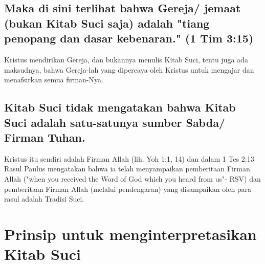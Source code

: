 \subsection{Maka di sini terlihat bahwa Gereja/ jemaat (bukan Kitab Suci saja) adalah "tiang penopang dan dasar kebenaran." (1 Tim 3:15)}
Kristus mendirikan Gereja, dan bukannya menulis Kitab Suci, tentu juga ada maksudnya, bahwa Gereja-lah yang dipercaya oleh Kristus untuk mengajar dan menafsirkan semua firman-Nya.

\subsection{Kitab Suci tidak mengatakan bahwa Kitab Suci adalah satu-satunya sumber Sabda/ Firman Tuhan.}
Kristus itu sendiri adalah Firman Allah (lih. Yoh 1:1, 14) dan dalam 1 Tes 2:13 Rasul Paulus mengatakan bahwa ia telah menyampaikan pemberitaan Firman Allah ("when you received the Word of God which you heard from us"- RSV) dan pemberitaan Firman Allah (melalui pendengaran) yang disampaikan oleh para rasul adalah Tradisi Suci.

\section{Prinsip untuk menginterpretasikan Kitab Suci}
